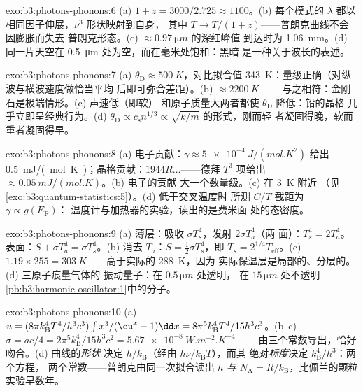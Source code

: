 \begin{solution}{exo:b3:photons-phonons:6}
(a) $1 + z = 3000/2.725 \approx 1100$。(b) 每个模式的 $\lambda$
都以相同因子伸展，$\nu^3$ 形状映射到自身，
其中 $T \to T/(1+z)$——普朗克曲线不会因膨胀而失去
普朗克形态。(c) $\approx\qty{0.97}{\micro m}$ 的深红峰值
到达时为 \qty{1.06}{mm}。(d) 同一片天空在
\qty{0.5}{\micro m} 处为空，而在毫米处饱和：黑暗
是一种关于波长的表述。
\end{solution}

\begin{solution}{exo:b3:photons-phonons:7}
(a) $\theta_{\text{D}} \approx \qty{500}{K}$，对比拟合值
\qty{343}{K}：量级正确（对纵波与横波速度做恰当平均
后即可弥合差距）。(b) $\approx\qty{2200}{K}$——
与之相符：金刚石是极端情形。(c) 声速低（即软）
和原子质量大两者都使 $\theta_{\text{D}}$ 降低：铅的晶格
几乎立即呈经典行为。(d) $\theta_{\text{D}} \propto
c_{\text{s}}n^{1/3} \propto \sqrt{k/m}$ 的形式，刚而轻
者凝固得晚，软而重者凝固得早。
\end{solution}

\begin{solution}{exo:b3:photons-phonons:8}
(a) 电子贡献：$\gamma \approx \qty{5e-4}{J/(mol.K^2)}$ 给出
\qty{0.5}{mJ/(mol.K)}；晶格贡献：$1944R\dots$——德拜 $T^3$
项给出 $\approx\qty{0.05}{mJ/(mol.K)}$。(b) 电子的贡献
大一个数量级。(c) 在 \qty{3}{K} 附近
（见\cref{exo:b3:quantum-statistics:5}）。(d) 低于交叉温度时
所测 $C/T$ 截距为 $\gamma \propto g(E_{\text{F}})$：
温度计与加热器的实验，读出的是费米面
处的态密度。
\end{solution}

\begin{solution}{exo:b3:photons-phonons:9}
(a) 薄层：吸收 $\sigma T_s^4$，发射 $2\sigma T_a^4$（两
面）：$T_s^4 = 2T_a^4$。表面：$S + \sigma T_a^4 = \sigma
T_s^4$。(b) 消去 $T_a$：$S = \tfrac12\sigma T_s^4$，即
$T_s = 2^{1/4}T_{\text{eff}}$。(c) $1.19 \times 255 =
\qty{303}{K}$——高于实际的 \qty{288}{K}，因为
实际保温层是局部的、分层的。(d) 三原子痕量气体的
振动量子：在 $0.5\,\unit{\micro m}$ 处透明，
在 $15\,\unit{\micro m}$ 处不透明——
\cref{pb:b3:harmonic-oscillator:1}中的分子。
\end{solution}

\begin{solution}{exo:b3:photons-phonons:10}
(a) $u = (8\pi k_{\text{B}}^4T^4/h^3c^3)\int x^3/(\eu^x - 1)\dd x
= 8\pi^5k_{\text{B}}^4T^4/15h^3c^3$。(b--c) $\sigma = ac/4 =
2\pi^5k_{\text{B}}^4/15h^3c^2 = \qty{5.67e-8}{W.m^{-2}.K^{-4}}$
——由三个常数导出，恰好吻合。(d) 曲线的\emph{形状}
决定 $h/k_{\text{B}}$（经由 $h\nu/k_{\text{B}}T$），而其
绝对\emph{标度}决定 $k_{\text{B}}^4/h^3$：两个方程，
两个常数——普朗克由同一次拟合读出 $h$ \emph{与} $N_{\text{A}} =
R/k_{\text{B}}$，比佩兰的颗粒实验早数年。
\end{solution}

